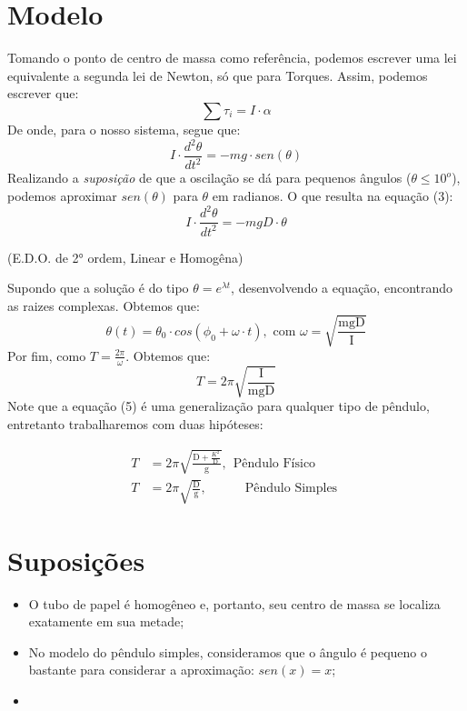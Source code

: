 \documentclass[a4paper]{report}
\begin{document}
\section*{Modelo}
\qquad Tomando o ponto de centro de massa como referência, 
podemos escrever uma lei equivalente a segunda lei de Newton, só que para Torques.
Assim, podemos escrever que:
\begin{equation}
    \sum{\tau_i} =  I\cdot \alpha
\end{equation}
\qquad De onde, para o nosso sistema, segue que:
\begin{equation}
    I \cdot \frac{d^2\theta}{dt ^2} = - mg\cdot sen(\theta)
\end{equation}
\qquad Realizando a \textit{suposição} de que a oscilação se dá para pequenos ângulos
($\theta \leq 10^{o} $), podemos aproximar $sen(\theta)$ para $\theta$ em radianos.
O que resulta na equação (3):
\begin{equation}
    I \cdot \frac{d^2\theta}{dt ^2} = - mgD\cdot \theta
\end{equation}
\begin{center}
    \small{(E.D.O. de 2° ordem, Linear e Homogêna)}
\end{center}
\qquad Supondo que a solução é do tipo $\theta = e^{\lambda t}$, desenvolvendo
a equação, encontrando as raizes complexas. Obtemos que:
\begin{equation}
    \theta(t) = \theta_0 \cdot cos\left( \phi_0 + \omega \cdot t\right), \text{ com } \omega = \sqrt{\frac{\text{mgD}}{\text{I}}}
\end{equation}
\qquad Por fim, como $T = \frac{2\pi}{\omega}$. Obtemos que:
\begin{equation}
   \boxed{T = 2\pi \sqrt{\frac{\text{I}}{\text{mgD}}}}
\end{equation}
\qquad Note que a equação (5) é uma generalização para qualquer
tipo de pêndulo, entretanto trabalharemos com duas hipóteses:


\begin{align}
        T &= 2\pi \sqrt{\frac{\text{D} + \frac{\text{$K^2$}}{\text{D}}}{\text{g}}}, \ \ \text{Pêndulo Físico }\\
        T &= 2\pi \sqrt{\frac{\text{D}}{\text{g}}},\quad \qquad \text{Pêndulo Simples }
\end{align}



\section*{Suposições}
\begin{itemize}
    \item O tubo de papel é homogêneo e, portanto, seu centro de massa se localiza exatamente em sua metade;
    \item No modelo do pêndulo simples, consideramos que o ângulo é pequeno o bastante para considerar a aproximação: \(sen(x) = x\);
    \item 
\end{itemize}
\end{document}
